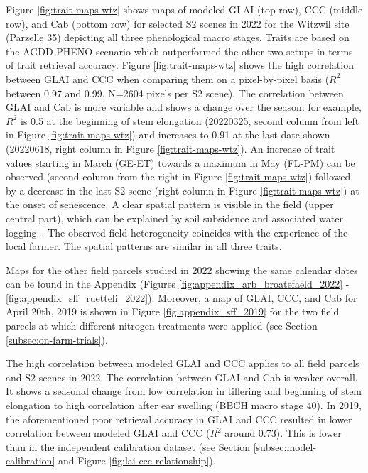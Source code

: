 Figure \ref{fig:trait-maps-wtz} shows maps of modeled \gls{GLAI} (top row), \gls{CCC} (middle row), and \gls{Cab} (bottom row) for selected \gls{S2} scenes in 2022 for the Witzwil site (Parzelle 35) depicting all three phenological macro stages. Traits are based on the AGDD-PHENO scenario which outperformed the other two setups in terms of trait retrieval accuracy. Figure \ref{fig:trait-maps-wtz} shows the high correlation between \gls{GLAI} and \gls{CCC} when comparing them on a pixel-by-pixel basis ($R^2$ between 0.97 and 0.99, N=2604 pixels per \gls{S2} scene). The correlation between \gls{GLAI} and \gls{Cab} is more variable and shows a change over the season: for example, $R^2$ is 0.5 at the beginning of stem elongation (20220325, second column from left in Figure \ref{fig:trait-maps-wtz}) and increases to 0.91 at the last date shown (20220618, right column in Figure \ref{fig:trait-maps-wtz}). An increase of trait values starting in March (GE-ET) towards a maximum in May (FL-PM) can be observed (second column from the right in Figure \ref{fig:trait-maps-wtz}) followed by a decrease in the last \gls{S2} scene (right column in Figure \ref{fig:trait-maps-wtz}) at the onset of senescence. A clear spatial pattern is visible in the field (upper central part), which can be explained by soil subsidence and associated water logging~\citep{egli_landschaftsdynamik_2020}. The observed field heterogeneity coincides with the experience of the local farmer. The spatial patterns are similar in all three traits.

Maps for the other field parcels studied in 2022 showing the same calendar dates can be found in the Appendix (Figures \ref{fig:appendix_arb_broatefaeld_2022} - \ref{fig:appendix_sff_ruetteli_2022}). Moreover, a map of GLAI, CCC, and \gls{Cab} for April 20th, 2019 is shown in Figure \ref{fig:appendix_sff_2019} for the two field parcels at which different nitrogen treatments were applied (see Section \ref{subsec:on-farm-trials}).

The high correlation between modeled \gls{GLAI} and \gls{CCC} applies to all field parcels and \gls{S2} scenes in 2022. The correlation between \gls{GLAI} and \gls{Cab} is weaker overall. It shows a seasonal change from low correlation in tillering and beginning of stem elongation to high correlation after ear swelling (BBCH macro stage 40). In 2019, the aforementioned poor retrieval accuracy in \gls{GLAI} and \gls{CCC} resulted in lower correlation between modeled \gls{GLAI} and \gls{CCC} ($R^2$ around 0.73). This is lower than in the independent calibration dataset (see Section \ref{subsec:model-calibration} and Figure \ref{fig:lai-ccc-relationship}).


